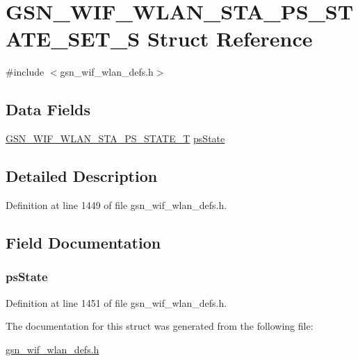 \hypertarget{a00405}{
\section{GSN\_\-WIF\_\-WLAN\_\-STA\_\-PS\_\-STATE\_\-SET\_\-S Struct Reference}
\label{a00405}
}


{\ttfamily \#include $<$gsn\_\-wif\_\-wlan\_\-defs.h$>$}

\subsection*{Data Fields}
\begin{DoxyCompactItemize}
\item 
\hyperlink{a00677_gaa2a092592d015a1963ac4736c11084d5}{GSN\_\-WIF\_\-WLAN\_\-STA\_\-PS\_\-STATE\_\-T} \hyperlink{a00405_a0b8aa2583dd1daa8aefefcf8a2e18825}{psState}
\end{DoxyCompactItemize}


\subsection{Detailed Description}


Definition at line 1449 of file gsn\_\-wif\_\-wlan\_\-defs.h.



\subsection{Field Documentation}
\hypertarget{a00405_a0b8aa2583dd1daa8aefefcf8a2e18825}{
\subsubsection[{psState}]{ {\bf psState}}}
\label{a00405_a0b8aa2583dd1daa8aefefcf8a2e18825}


Definition at line 1451 of file gsn\_\-wif\_\-wlan\_\-defs.h.



The documentation for this struct was generated from the following file:\begin{DoxyCompactItemize}
\item 
\hyperlink{a00613}{gsn\_\-wif\_\-wlan\_\-defs.h}\end{DoxyCompactItemize}
